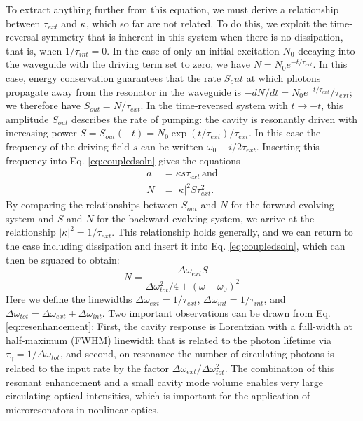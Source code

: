  To extract anything further from this equation, we must derive a relationship between $\tau_{ext}$ and $\kappa$, which so far are not related. To do this, we exploit the time-reversal symmetry that is inherent in this system when there is no dissipation, that is, when $1/\tau_{int}=0$. In the case of only an initial excitation $N_0$ decaying into the waveguide with the driving term set to zero, we have $N=N_0e^{-t/\tau_{ext}}$. In this case, energy conservation guarantees that the rate $S_out$ at which photons propagate away from the resonator in the waveguide is $-dN/dt=N_0e^{-t/\tau_{ext}}/\tau_{ext}$; we therefore have $S_{out}=N/\tau_{ext}$. In the time-reversed system with $t\rightarrow-t$, this amplitude $S_{out}$ describes the rate of pumping: the cavity is resonantly driven with increasing power $S=S_{out}(-t)=N_0\exp(t/\tau_{ext})/\tau_{ext}$. In this case the frequency of the driving field $s$ can be written $\omega_0-i/2\tau_{ext}$. Inserting this frequency into Eq. \ref{eq:coupledsoln} gives the equations
 \begin{align}
  a&=\kappa s \tau_{ext}\, \text{and}\\
   N&=|\kappa|^2 S \tau_{ext}^2.
   \end{align}
   By comparing the relationships between $S_{out}$ and $N$ for the forward-evolving system and $S$ and $N$ for the backward-evolving system, we arrive at the relationship $|\kappa|^2=1/\tau_{ext}$. This relationship holds generally, and we can return to the case including dissipation and insert it into Eq. \ref{eq:coupledsoln}, which can then be squared to obtain:
   \begin{equation}
   N=\frac{\Delta\omega_{ext}S}{\Delta\omega_{tot}^2/4+(\omega-\omega_0)^2} \label{eq:resenhancement}
   \end{equation}
   Here we define the linewidths $\Delta\omega_{ext}=1/\tau_{ext}$, $\Delta\omega_{int}=1/\tau_{int}$, and $\Delta\omega_{tot}=\Delta\omega_{ext}+\Delta\omega_{int}$. Two important observations can be drawn from Eq. \ref{eq:resenhancement}: First, the cavity response is Lorentzian with a full-width at half-maximum (FWHM) linewidth that is related to the photon lifetime via $\tau_\gamma=1/\Delta\omega_{tot}$, and second, on resonance the number of circulating photons is related to the input rate by the factor $\Delta\omega_{ext}/\Delta\omega_{tot}^2$. The combination of this resonant enhancement and a small cavity mode volume enables very large circulating optical intensities, which is important for the application of microresonators in nonlinear optics.
   
